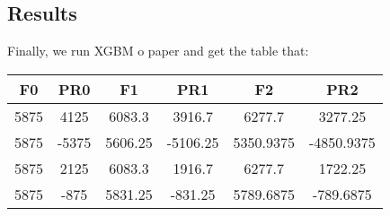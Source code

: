 \documentclass[a4paper,12pt]{journal}
\begin{document}
	\subsection*{Results}
	Finally, we run XGBM o paper and get the table that:
	\begin{center}
		\begin{tabular}{|c|c|c|c|c|c|}
			\hline
			F0&PR0&F1&PR1&F2&PR2\\\hline
			5875&4125&6083.3&3916.7&6277.7&3277.25\\\hline
			5875&-5375&5606.25&-5106.25&5350.9375&-4850.9375\\\hline
			5875&2125&6083.3&1916.7&6277.7& 1722.25\\\hline
			5875&-875&5831.25&-831.25&5789.6875&-789.6875\\\hline
		\end{tabular}
	\end{center}
\end{document}
